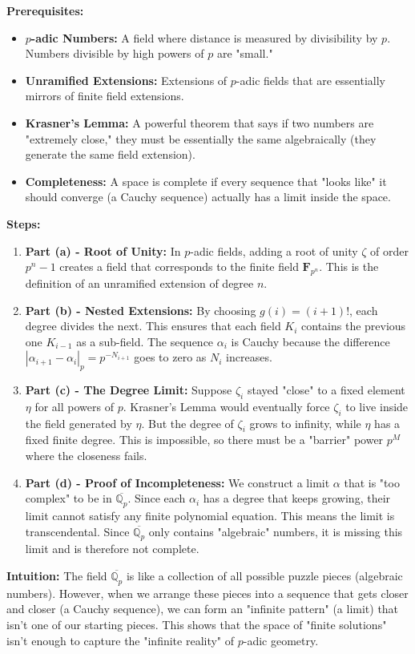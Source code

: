 \begin{solution}
\textbf{Prerequisites:}
\begin{itemize}
    \item \textbf{$p$-adic Numbers:} A field where distance is measured by divisibility by $p$. Numbers divisible by high powers of $p$ are "small."
    \item \textbf{Unramified Extensions:} Extensions of $p$-adic fields that are essentially mirrors of finite field extensions.
    \item \textbf{Krasner's Lemma:} A powerful theorem that says if two numbers are "extremely close," they must be essentially the same algebraically (they generate the same field extension).
    \item \textbf{Completeness:} A space is complete if every sequence that "looks like" it should converge (a Cauchy sequence) actually has a limit inside the space.
\end{itemize}

\textbf{Steps:}
\begin{enumerate}
    \item \textbf{Part (a) - Root of Unity:} In $p$-adic fields, adding a root of unity $\zeta$ of order $p^n-1$ creates a field that corresponds to the finite field $\mathbf{F}_{p^n}$. This is the definition of an unramified extension of degree $n$.
    \item \textbf{Part (b) - Nested Extensions:} By choosing $g(i) = (i+1)!$, each degree divides the next. This ensures that each field $K_i$ contains the previous one $K_{i-1}$ as a sub-field. The sequence $\alpha_i$ is Cauchy because the difference $|\alpha_{i+1} - \alpha_i|_p = p^{-N_{i+1}}$ goes to zero as $N_i$ increases.
    \item \textbf{Part (c) - The Degree Limit:} Suppose $\zeta_i$ stayed "close" to a fixed element $\eta$ for all powers of $p$. Krasner's Lemma would eventually force $\zeta_i$ to live inside the field generated by $\eta$. But the degree of $\zeta_i$ grows to infinity, while $\eta$ has a fixed finite degree. This is impossible, so there must be a "barrier" power $p^M$ where the closeness fails.
    \item \textbf{Part (d) - Proof of Incompleteness:} We construct a limit $\alpha$ that is "too complex" to be in $\overline{\mathbb{Q}_p}$. Since each $\alpha_i$ has a degree that keeps growing, their limit cannot satisfy any finite polynomial equation. This means the limit is transcendental. Since $\overline{\mathbb{Q}_p}$ only contains "algebraic" numbers, it is missing this limit and is therefore not complete.
\end{enumerate}

\textbf{Intuition:}
The field $\overline{\mathbb{Q}_p}$ is like a collection of all possible puzzle pieces (algebraic numbers). However, when we arrange these pieces into a sequence that gets closer and closer (a Cauchy sequence), we can form an "infinite pattern" (a limit) that isn't one of our starting pieces. This shows that the space of "finite solutions" isn't enough to capture the "infinite reality" of $p$-adic geometry.
\end{solution}
